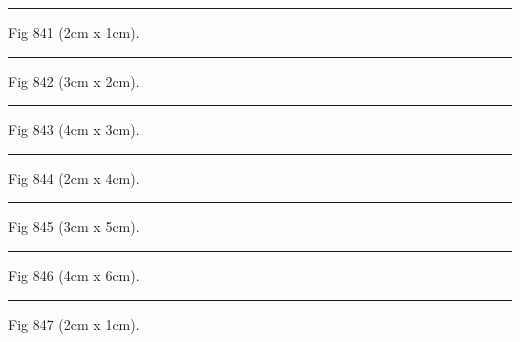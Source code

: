 \documentclass[a4paper,11pt]{article}
\begin{document}
\begin{swarmwrap}%
  \begin{minipage}[t]{2cm}
    \centering
    \rule{\linewidth}{1cm}
    {\footnotesize Fig 841 (2cm x 1cm).}
  \end{minipage}%
\end{swarmwrap}%
\swarmwrapnext
\lipsum[91]%

\begin{swarmwrap}%
  \begin{minipage}[t]{3cm}
    \centering
    \rule{\linewidth}{2cm}
    {\footnotesize Fig 842 (3cm x 2cm).}
  \end{minipage}%
\end{swarmwrap}%
\swarmwrapnext
\lipsum[92]%

\begin{swarmwrap}%
  \begin{minipage}[t]{4cm}
    \centering
    \rule{\linewidth}{3cm}
    {\footnotesize Fig 843 (4cm x 3cm).}
  \end{minipage}%
\end{swarmwrap}%
\swarmwrapnext
\lipsum[93]%

\begin{swarmwrap}%
  \begin{minipage}[t]{2cm}
    \centering
    \rule{\linewidth}{4cm}
    {\footnotesize Fig 844 (2cm x 4cm).}
  \end{minipage}%
\end{swarmwrap}%
\swarmwrapnext
\lipsum[94]%

\begin{swarmwrap}%
  \begin{minipage}[t]{3cm}
    \centering
    \rule{\linewidth}{5cm}
    {\footnotesize Fig 845 (3cm x 5cm).}
  \end{minipage}%
\end{swarmwrap}%
\swarmwrapnext
\lipsum[95]%

\begin{swarmwrap}%
  \begin{minipage}[t]{4cm}
    \centering
    \rule{\linewidth}{6cm}
    {\footnotesize Fig 846 (4cm x 6cm).}
  \end{minipage}%
\end{swarmwrap}%
\swarmwrapnext
\lipsum[96]%

\begin{swarmwrap}%
  \begin{minipage}[t]{2cm}
    \centering
    \rule{\linewidth}{1cm}
    {\footnotesize Fig 847 (2cm x 1cm).}
  \end{minipage}%
\end{swarmwrap}%
\swarmwrapnext
\lipsum[97]%
\end{document}
